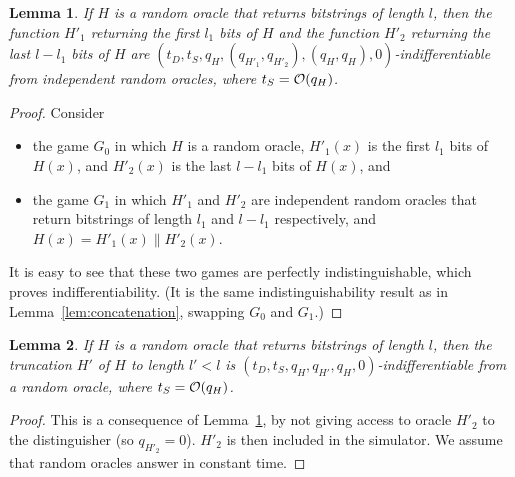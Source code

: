 \documentclass[compsoc, conference, letterpaper, 10pt, times]{IEEEtran}
\newtheorem{lemma}{Lemma}
\begin{document}
\begin{lemma}\label{lem:splitting}
If $H$ is a random oracle that returns bitstrings of length $l$, then 
the function $H'_1$ returning the first $l_1$ bits of $H$
and the function $H'_2$ returning the last $l-l_1$ bits of $H$
are $(t_D, t_S, q_H, (q_{H'_1}, q_{H'_2}), (q_H, q_H), 0)$-indifferentiable from independent
random oracles, where $t_S = {\cal O}(q_H)$.
\end{lemma}
\begin{proof}
Consider
\begin{itemize}[leftmargin=*]
\item  the game $G_0$ in which $H$ is a random oracle,
  $H'_1(x)$ is the first $l_1$ bits of $H(x)$, and
  $H'_2(x)$ is the last $l - l_1$ bits of $H(x)$, and
\item the game $G_1$ in which $H'_1$ and $H'_2$ are independent random oracles that return bitstrings
  of length $l_1$ and $l - l_1$ respectively,
  and $H(x) = H'_1(x) \| H'_2(x)$.
\end{itemize}
It is easy to see that these two games are perfectly indistinguishable,
which proves indifferentiability. (It is the same indistinguishability
result as in Lemma~\ref{lem:concatenation}, swapping $G_0$ and $G_1$.)
\end{proof}


\begin{lemma}\label{lem:truncation}
If $H$ is a random oracle that returns bitstrings of length $l$, then 
the truncation $H'$ of $H$ to length $l' < l$ is $(t_D, t_S, q_H, q_{H'}, q_H, 0)$-indifferentiable from a random oracle, where $t_S = {\cal O}(q_H)$.
\end{lemma}
\begin{proof}
  This is a consequence of Lemma~\ref{lem:splitting}, by not giving
  access to oracle $H'_2$ to the distinguisher (so $q_{H'_2} = 0$).
  $H'_2$ is then included in the simulator. We assume that random
  oracles answer in constant time.
\end{proof}
\end{document}
